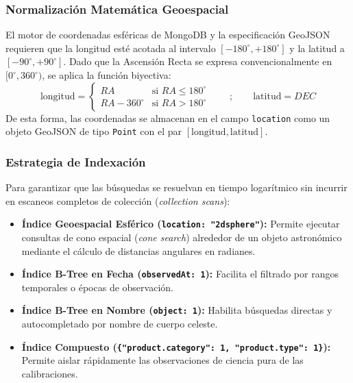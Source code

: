\documentclass[10pt]{article}
\begin{document}
\subsubsection{Normalización Matemática Geoespacial}
El motor de coordenadas esféricas de MongoDB y la especificación GeoJSON requieren que la longitud esté acotada al intervalo $[-180^{\circ}, +180^{\circ}]$ y la latitud a $[-90^{\circ}, +90^{\circ}]$. Dado que la Ascensión Recta se expresa convencionalmente en $[0^{\circ}, 360^{\circ})$, se aplica la función biyectiva:
\begin{equation}
\text{longitud} = 
\begin{cases} 
RA & \text{si } RA \leq 180^{\circ} \\ 
RA - 360^{\circ} & \text{si } RA > 180^{\circ} 
\end{cases}
\qquad;\qquad
\text{latitud} = DEC
\end{equation}
De esta forma, las coordenadas se almacenan en el campo \texttt{location} como un objeto GeoJSON de tipo \texttt{Point} con el par $[\text{longitud}, \text{latitud}]$.

\subsubsection{Estrategia de Indexación}
Para garantizar que las búsquedas se resuelvan en tiempo logarítmico sin incurrir en escaneos completos de colección (\textit{collection scans}):
\begin{itemize}
    \item \textbf{Índice Geoespacial Esférico (\texttt{location: "2dsphere"}):} Permite ejecutar consultas de cono espacial (\textit{cone search}) alrededor de un objeto astronómico mediante el cálculo de distancias angulares en radianes.
    \item \textbf{Índice B-Tree en Fecha (\texttt{observedAt: 1}):} Facilita el filtrado por rangos temporales o épocas de observación.
    \item \textbf{Índice B-Tree en Nombre (\texttt{object: 1}):} Habilita búsquedas directas y autocompletado por nombre de cuerpo celeste.
    \item \textbf{Índice Compuesto (\texttt{\{"product.category": 1, "product.type": 1\}}):} Permite aislar rápidamente las observaciones de ciencia pura de las calibraciones.
\end{itemize}
\end{document}
